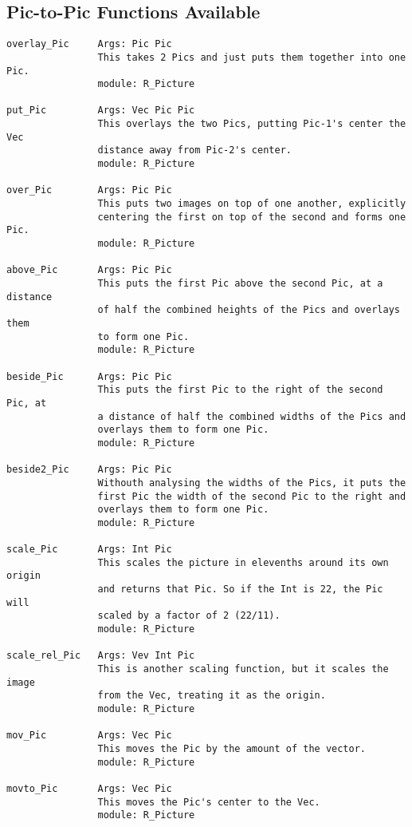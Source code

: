 \subsection {Pic-to-Pic Functions Available}

\begin{verbatim}
overlay_Pic     Args: Pic Pic 
                This takes 2 Pics and just puts them together into one Pic.
                module: R_Picture

put_Pic	        Args: Vec Pic Pic
                This overlays the two Pics, putting Pic-1's center the Vec 
                distance away from Pic-2's center.
                module: R_Picture

over_Pic        Args: Pic Pic
                This puts two images on top of one another, explicitly 
                centering the first on top of the second and forms one Pic.
                module: R_Picture
                
above_Pic       Args: Pic Pic
                This puts the first Pic above the second Pic, at a distance
                of half the combined heights of the Pics and overlays them
                to form one Pic.
                module: R_Picture

beside_Pic      Args: Pic Pic
                This puts the first Pic to the right of the second Pic, at
                a distance of half the combined widths of the Pics and 
                overlays them to form one Pic.
                module: R_Picture

beside2_Pic     Args: Pic Pic
                Withouth analysing the widths of the Pics, it puts the
                first Pic the width of the second Pic to the right and
                overlays them to form one Pic.
                module: R_Picture

scale_Pic       Args: Int Pic 
                This scales the picture in elevenths around its own origin
                and returns that Pic. So if the Int is 22, the Pic will
                scaled by a factor of 2 (22/11).
                module: R_Picture

scale_rel_Pic   Args: Vev Int Pic
                This is another scaling function, but it scales the image
                from the Vec, treating it as the origin. 
                module: R_Picture

mov_Pic         Args: Vec Pic
                This moves the Pic by the amount of the vector.  
                module: R_Picture

movto_Pic       Args: Vec Pic
                This moves the Pic's center to the Vec.
                module: R_Picture


\end{verbatim}
